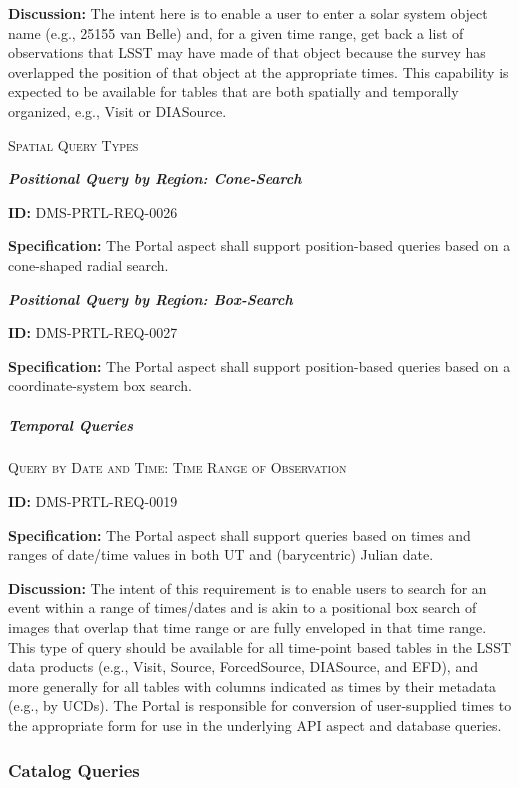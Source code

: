 \documentclass[SE,toc,lsstdraft]{lsstdoc}
\begin{document}
\textbf{Discussion:}
The intent here is to enable a user to enter a solar system object name (e.g., 25155 van Belle) and, for a given time range, get back a list of observations that LSST may have made of that object because the survey has overlapped the position of that object at the appropriate times.
This capability is expected to be available for tables that are both spatially and temporally organized, e.g., Visit or DIASource.

\textsc{Spatial Query Types}

\textbf{\textit{Positional Query by Region: Cone-Search}}

\label{DMS-PRTL-REQ-0026}
\textbf{ID:} DMS-PRTL-REQ-0026

\textbf{Specification:}
The Portal aspect shall support position-based queries based on a cone-shaped radial search.

\textbf{\textit{Positional Query by Region: Box-Search}}

\label{DMS-PRTL-REQ-0027}
\textbf{ID:} DMS-PRTL-REQ-0027

\textbf{Specification:}
The Portal aspect shall support position-based queries based on a coordinate-system box search.

\subparagraph{Temporal Queries}\hfill  %

\textsc{Query by Date and Time: Time Range of Observation}

\label{DMS-PRTL-REQ-0019}
\textbf{ID:} DMS-PRTL-REQ-0019

\textbf{Specification:}
The Portal aspect shall support queries based on times and ranges of date/time values in both UT and (barycentric) Julian date.

\textbf{Discussion:}
The intent of this requirement is to enable users to search for an event within a range of times/dates and is akin to a positional box search of images that overlap that time range or are fully enveloped in that time range.
This type of query should be available for all time-point based tables in the LSST data products (e.g., Visit, Source, ForcedSource, DIASource, and EFD), and more generally for all tables with columns indicated as times by their metadata (e.g., by UCDs).
The Portal is responsible for conversion of user-supplied times to the appropriate form for use in the underlying API aspect and database queries.

\subsubsection{Catalog Queries}
\end{document}
